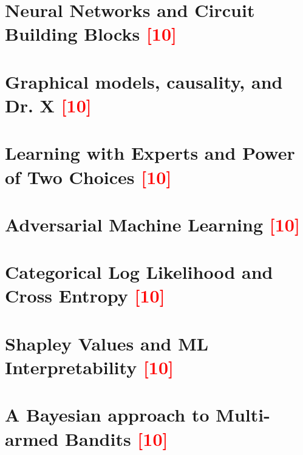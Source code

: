 \documentclass[letterpaper,12pt,addpoints]{exam}
\begin{document}
\newpage
\begin{questions}
\question[10]
\section*{Neural Networks and Circuit Building Blocks \textcolor{red}{[10]}} 

\addpoints

\newpage
\question[10]
\section*{Graphical models, causality, and Dr. X \textcolor{red}{[10]}} 

\addpoints

\newpage
\question[10]
\section*{Learning with Experts and Power of Two Choices \textcolor{red}{[10]}} 

\addpoints

\newpage
\question[10]
\section*{Adversarial Machine Learning \textcolor{red}{[10]}} 

\addpoints

\newpage
\question[10]
\section*{Categorical Log Likelihood and Cross Entropy \textcolor{red}{[10]}}

\addpoints

\newpage
\question[10]
\section*{Shapley Values and ML Interpretability \textcolor{red}{[10]}} 

\addpoints

\newpage
\question[10]
\section*{A Bayesian approach to Multi-armed Bandits \textcolor{red}{[10]}}

\addpoints

\end{questions}
\end{document}
